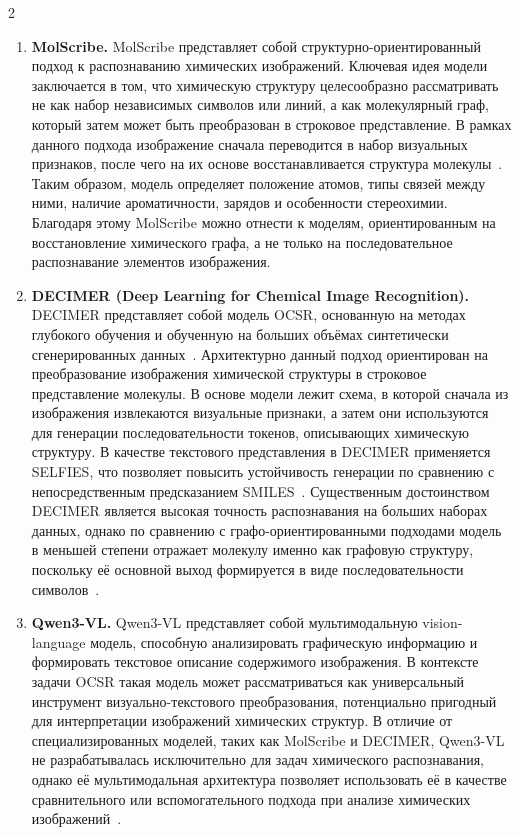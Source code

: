 \documentclass[11pt]{article}
\begin{document}
\begin{multicols}{2}
\begin{enumerate}
	\item \textbf{MolScribe.}  
	MolScribe представляет собой структурно-ориентированный подход к распознаванию химических изображений. Ключевая идея модели заключается в том, что химическую структуру целесообразно рассматривать не как набор независимых символов или линий, а как молекулярный граф, который затем может быть преобразован в строковое представление. В рамках данного подхода изображение сначала переводится в набор визуальных признаков, после чего на их основе восстанавливается структура молекулы~\cite{refMolScribe}. Таким образом, модель определяет положение атомов, типы связей между ними, наличие ароматичности, зарядов и особенности стереохимии. Благодаря этому MolScribe можно отнести к моделям, ориентированным на восстановление химического графа, а не только на последовательное распознавание элементов изображения.
	
	\item \textbf{DECIMER (Deep Learning for Chemical Image Recognition).}  
	DECIMER представляет собой модель OCSR, основанную на методах глубокого обучения и обученную на больших объёмах синтетически сгенерированных данных~\cite{refDECIMER}. Архитектурно данный подход ориентирован на преобразование изображения химической структуры в строковое представление молекулы. В основе модели лежит схема, в которой сначала из изображения извлекаются визуальные признаки, а затем они используются для генерации последовательности токенов, описывающих химическую структуру. В качестве текстового представления в DECIMER применяется SELFIES, что позволяет повысить устойчивость генерации по сравнению с непосредственным предсказанием SMILES~\cite{refDECIMERJournal}. Существенным достоинством DECIMER является высокая точность распознавания на больших наборах данных, однако по сравнению с графо-ориентированными подходами модель в меньшей степени отражает молекулу именно как графовую структуру, поскольку её основной выход формируется в виде последовательности символов~\cite{refDECIMERJournal}.
	
	\item \textbf{Qwen3-VL.}  
	Qwen3-VL представляет собой мультимодальную vision-language модель, способную анализировать графическую информацию и формировать текстовое описание содержимого изображения. В контексте задачи OCSR такая модель может рассматриваться как универсальный инструмент визуально-текстового преобразования, потенциально пригодный для интерпретации изображений химических структур. В отличие от специализированных моделей, таких как MolScribe и DECIMER, Qwen3-VL не разрабатывалась исключительно для задач химического распознавания, однако её мультимодальная архитектура позволяет использовать её в качестве сравнительного или вспомогательного подхода при анализе химических изображений~\cite{refQwen3VL}.
\end{enumerate}


\end{multicols}
\end{document}
